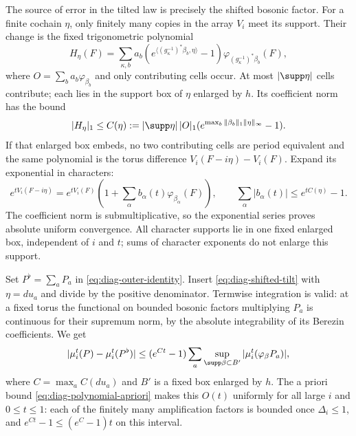 The source of error in the tilted law is precisely the shifted
bosonic factor. For a finite cochain $\eta$, only finitely
many copies in the array $V_i$ meet its support. Their change
is the fixed trigonometric polynomial
\begin{equation}\label{eq:diag-array-shift}
 H_\eta(F)=\sum_{\kappa,b}a_b
       (e^{\langle(g_\kappa^{-1})^*\beta_b,\eta\rangle}-1)
                        \varphi_{(g_\kappa^{-1})^*\beta_b}(F),
\end{equation}
where $O=\sum_ba_b\varphi_{\beta_b}$ and only contributing
cells occur. At most $|\supp\eta|$ cells contribute; each
lies in the support box of $\eta$ enlarged by $h$. Its
coefficient norm has the bound
\begin{equation}\label{eq:diag-array-shift-size}
 |H_\eta|_1\le C(\eta):=|\supp\eta|\,|O|_1
        (e^{\max_b\|\beta_b\|_1\|\eta\|_\infty}-1).
\end{equation}
If that enlarged box embeds, no two contributing cells are
period equivalent and the same polynomial is the torus
difference $V_i(F-i\eta)-V_i(F)$. Expand its exponential
in characters:
\begin{equation}\label{eq:diag-shifted-tilt}
 e^{tV_i(F-i\eta)}=e^{tV_i(F)}
        \left(1+\sum_\alpha b_\alpha(t)\varphi_{\beta_\alpha}(F)\right),
 \qquad\sum_\alpha|b_\alpha(t)|\le e^{tC(\eta)}-1.
\end{equation}
The coefficient norm is submultiplicative, so the exponential
series proves absolute uniform convergence. All character
supports lie in one fixed enlarged box, independent of $i$
and $t$; sums of character exponents do not enlarge this support.

Set $P^\flat=\sum_aP_a$ in \eqref{eq:diag-outer-identity}.
Insert \eqref{eq:diag-shifted-tilt} with $\eta=du_a$ and divide
by the positive denominator. Termwise integration is valid:
at a fixed torus the functional on bounded bosonic factors
multiplying $P_a$ is continuous for their supremum norm, by
the absolute integrability of its Berezin coefficients.
We get
\begin{equation}\label{eq:diag-outer-error}
 |\mu_i^t(P)-\mu_i^t(P^\flat)|
 \le(e^{Ct}-1)\sum_a
       \sup_{\supp\beta\subset B'}|\mu_i^t(\varphi_\beta P_a)|,
\end{equation}
where $C=\max_aC(du_a)$ and $B'$ is a fixed box enlarged
by $h$. The a priori bound
\eqref{eq:diag-polynomial-apriori} makes this $O(t)$ uniformly
for all large $i$ and $0\le t\le1$: each of the finitely many
amplification factors is bounded once $\Delta_i\le1$, and
$e^{Ct}-1\le(e^C-1)t$ on this interval.

